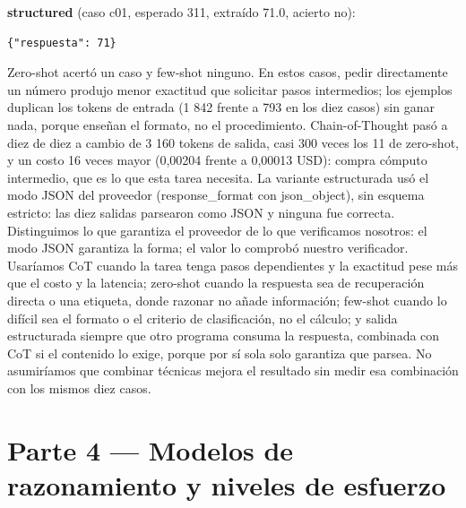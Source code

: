 \documentclass[runningheads]{llncs}
\begin{document}
\smallskip\noindent\textbf{structured} (caso c01, esperado 311, extraído 71.0, acierto no):
\begin{verbatim}
{"respuesta": 71}
\end{verbatim}
Zero-shot acertó un caso y few-shot ninguno. En estos casos, pedir directamente un número produjo menor exactitud que
solicitar pasos intermedios; los ejemplos duplican los tokens de entrada (1 842 frente a 793 en los diez casos)
sin ganar nada, porque enseñan el formato, no el procedimiento.
Chain-of-Thought pasó a diez de diez a cambio de 3 160 tokens de salida, casi
300 veces los 11 de zero-shot, y un costo 16 veces mayor (0,00204 frente a
0,00013 USD): compra cómputo intermedio, que es lo que esta tarea necesita. La
variante estructurada usó el modo JSON del proveedor (response\_format con
json\_object), sin esquema estricto: las diez salidas parsearon como JSON y
ninguna fue correcta. Distinguimos lo que garantiza el proveedor de lo que
verificamos nosotros: el modo JSON garantiza la forma; el valor lo comprobó
nuestro verificador. Usaríamos CoT cuando la tarea tenga pasos dependientes y
la exactitud pese más que el costo y la latencia; zero-shot cuando la
respuesta sea de recuperación directa o una etiqueta, donde razonar no añade
información; few-shot cuando lo difícil sea el formato o el criterio de
clasificación, no el cálculo; y salida estructurada siempre que otro programa
consuma la respuesta, combinada con CoT si el contenido lo exige, porque por
sí sola solo garantiza que parsea. No asumiríamos que combinar técnicas mejora
el resultado sin medir esa combinación con los mismos diez casos.

\section{Parte 4 --- Modelos de razonamiento y niveles de esfuerzo}
\end{document}
